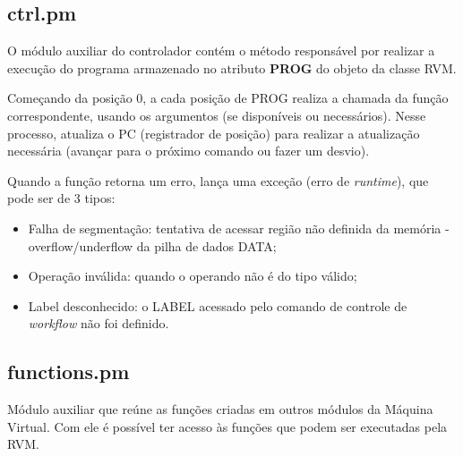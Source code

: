 \documentclass[a4paper]{article}
\begin{document}
    \subsection{ctrl.pm}
    
        O módulo auxiliar do controlador contém o método responsável 
        por realizar a execução do programa armazenado no atributo 
        \textbf{PROG} do objeto da classe RVM. 
        
        Começando da posição 0, a cada posição de PROG realiza a 
        chamada da função correspondente, usando os argumentos (se 
        disponíveis ou necessários). Nesse processo, atualiza o PC 
        (registrador de posição) para realizar a atualização 
        necessária (avançar para o próximo comando ou fazer um desvio).
        
        Quando a função retorna um erro, lança uma exceção (erro de 
        \emph{runtime}), que pode ser de 3 tipos:
        \begin{itemize}
            
            \item Falha de segmentação: tentativa de acessar região 
                                        não definida da memória -
                                        overflow/underflow da
                                        pilha de dados DATA;
                                        
            \item Operação inválida:    quando o operando não é do tipo 
                                        válido;
                                        
            \item Label desconhecido:   o LABEL acessado pelo comando 
                                        de controle de \emph{workflow} 
                                        não foi definido.
                                        
        \end{itemize}
        
    \subsection{functions.pm}
        
        Módulo auxiliar que reúne as funções criadas em outros módulos 
        da Máquina Virtual. Com ele é possível ter acesso às funções 
        que podem ser executadas pela RVM.        
        
\end{document}
